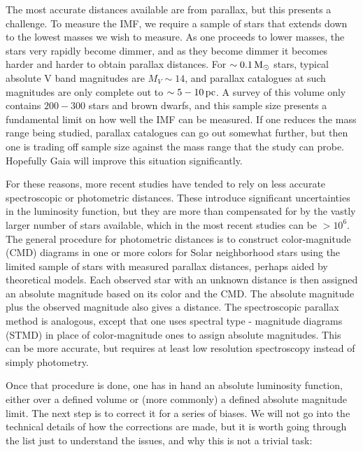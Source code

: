 \documentclass[a4paper,10pt]{article}
\begin{document}
{\noindent}The most accurate distances available are from parallax, but this presents a challenge. To measure the IMF, we require a sample of stars that extends down to the lowest masses we wish to measure. As one proceeds to lower masses, the stars very rapidly become dimmer, and as they become dimmer it becomes harder and harder to obtain parallax distances. For $\sim0.1\,{\rm M_\odot}$ stars, typical absolute V band magnitudes are $M_V\sim14$, and parallax catalogues at such magnitudes are only complete out to $\sim5-10\,{\rm pc}$. A survey of this volume only contains $200-300$ stars and brown dwarfs, and this sample size presents a fundamental limit on how well the IMF can be measured. If one reduces the mass range being studied, parallax catalogues can go out somewhat further, but then one is trading off sample size against the mass range that the study can probe. Hopefully Gaia will improve this situation significantly.

{\noindent}For these reasons, more recent studies have tended to rely on less accurate spectroscopic or photometric distances. These introduce significant uncertainties in the luminosity function, but they are more than compensated for by the vastly larger number of stars available, which in the most recent studies can be $>10^6$. The general procedure for photometric distances is to construct color-magnitude (CMD) diagrams in one or more colors for Solar neighborhood stars using the limited sample of stars with measured parallax distances, perhaps aided by theoretical models. Each observed star with an unknown distance is then assigned an absolute magnitude based on its color and the CMD. The absolute magnitude plus the observed magnitude also gives a distance. The spectroscopic parallax method is analogous, except that one uses spectral type - magnitude diagrams (STMD) in place of color-magnitude ones to assign absolute magnitudes. This can be more accurate, but requires at least low resolution spectroscopy instead of simply photometry.

{\noindent}Once that procedure is done, one has in hand an absolute luminosity function, either over a defined volume or (more commonly) a defined absolute magnitude limit. The next step is to correct it for a series of biases. We will not go into the technical details of how the corrections are made, but it is worth going through the list just to understand the issues, and why this is not a trivial task:
\end{document}
